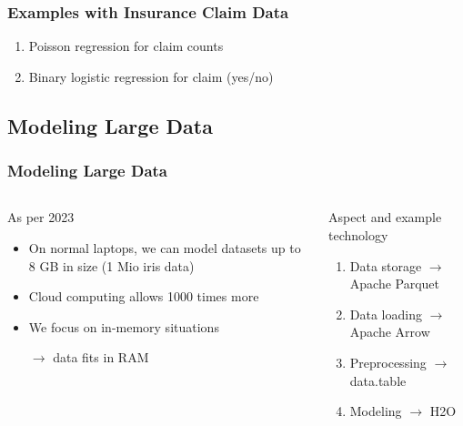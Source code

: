 \begin{frame}
	\frametitle{Examples with Insurance Claim Data}
	\begin{enumerate}
		\item Poisson regression for claim counts
		\item Binary logistic regression for claim (yes/no)
	\end{enumerate}
\end{frame}

\subsection{Modeling Large Data}

\begin{frame}
	\frametitle{Modeling Large Data}
	\begin{columns}[onlytextwidth]
		\begin{block}{As per 2023}
			\begin{itemize}
				\item On normal laptops, we can model datasets up to 8 GB in size
				(1 Mio iris data)
				\item Cloud computing allows 1000 times more
				\item We focus on in-memory situations
				
				$\rightarrow$ data fits in RAM
			\end{itemize}
		\end{block}
		
		\begin{block}{Aspect and example technology}
			\begin{enumerate}
				\item Data storage $\rightarrow$ Apache Parquet
				\item Data loading $\rightarrow$ Apache Arrow
				\item Preprocessing $\rightarrow$ data.table
				\item Modeling $\rightarrow$ H2O
			\end{enumerate}
			\vphantom{a}
		\end{block}
	\end{columns}

	\vfill
	
	\begin{example}
	\end{example}
\end{frame}
